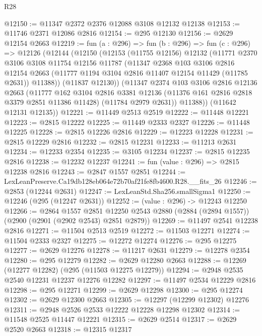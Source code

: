 \begin{lexlean}{R28}
\begin{coremodule}
@12150 := @11347 @2372 @2376 @12088 @3108 @12132 @12138
@12153 := @11746 @2371 @12086 @2816
@12154 := @295 @12130
@12156 := @2629 @12154 @2663
@12219 := fun (a : @296) =>
  fun (b : @296) =>
  fun (c : @296) =>
  @12126
    (@12144
      (@12150
        (@12153
          (@11755 @12156)
          @12132
          (@11771
            @2370
            @3106
            @3108
            @11754
            @12156
            @11787
            (@11347
              @2368
              @103
              @3106
              @2816
              @12154
              @2663
              (@11777 @1194 @3104 @2816 @11407 @12154 @11429 (@11785 @2631))
              @11388))
          (@11837 @12130))
        (@11347
          @2374
          @103
          @3106
          @2816
          @12136
          @2663
          (@11777
            @162
            @3104
            @2816
            @3381
            @12136
            (@11376 @161 @2816 @2818 @3379 @2851 @11386 @11428)
            (@11784 @2979 @2631))
          @11388))
      (@11642 @12131 @12135))
@12221 := @11449 @2513 @2519
@12222 := @11448 @12221
@12223 := @2815 @12222
@12225 := @11449 @2333 @2327
@12226 := @11448 @12225
@12228 := @2815 @12226 @2816
@12229 := @12223 @12228
@12231 := @2815 @12229 @2816
@12232 := @2815 @12231
@12233 := @11213 @2631
@12234 := @12233 @2354
@12235 := @3105 @12234
@12237 := @2815 @12235 @2816
@12238 := @12232 @12237
@12241 := fun (value : @296) => @2815 @12238 @2816
@12243 := @2847 @1557 @2851
@12244 := LexLeanPreserve.Ca19db128eb064e72b70af21fe8fb4600.R28.__fits_26
@12246 := @2853 (@12244 @2631)
@12247 := LexLeanStd.Sha256.smallSigma1
@12250 := @12246 (@295 (@12247 @2631))
@12252 := (value : @296) -> @12243 @12250
@12266 := @2864
    @1557
    @2851
    @12250
    @2543
    @2880
    (@2884 (@2894 @1557))
    (@2900 (@2901 (@2902 @2543) @2851 @2879))
@12269 := @11497 @2541 @12238 @2816
@12271 := @11504 @2513 @2519
@12272 := @11503 @12271
@12274 := @11504 @2333 @2327
@12275 := @12272 @12274
@12276 := @295 @12275
@12277 := @2629 @12276
@12278 := @11217 @2631
@12279 := @12278 @2354
@12280 := @295 @12279
@12282 := @2629 @12280 @2663
@12288 := @12269 (@12277 @12282) (@295 (@11503 @12275 @12279))
@12294 := @2948 @2535 @2540 @12231 @12237 @12276 @12282
@12297 := @11497 @2534 @12229 @2816
@12298 := @295 @12271
@12299 := @2629 @12298
@12300 := @295 @12274
@12302 := @2629 @12300 @2663
@12305 := @12297 (@12299 @12302) @12276
@12311 := @2948 @2526 @2533 @12222 @12228 @12298 @12302
@12314 := @11548 @2525 @11447 @12221
@12315 := @2629 @2514
@12317 := @2629 @2520 @2663
@12318 := @12315 @12317

\end{coremodule}
\end{lexlean}
